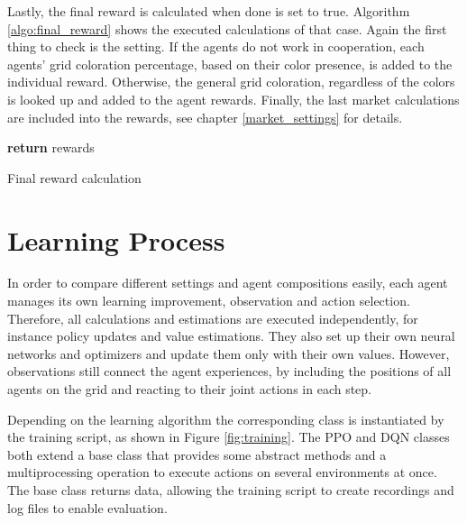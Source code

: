 Lastly, the final reward is calculated when done is set to true. Algorithm \ref{algo:final_reward} shows the executed calculations of that case. Again the first thing to check is the setting. If the agents do not work in cooperation, each agents' grid coloration percentage, based on their color presence, is added to the individual reward. Otherwise, the general grid coloration, regardless of the colors is looked up and added to the agent rewards. Finally, the last market calculations are included into the rewards, see chapter \ref{market_settings} for details.

\begin{algorithm}[H]
    \DontPrintSemicolon
    \textbf{return} rewards\;
    \caption{Final reward calculation}\label{algo:final_reward}
\end{algorithm}

\section{Learning Process}\label{learning_process}
In order to compare different settings and agent compositions easily, each agent manages its own learning improvement, observation and action selection. Therefore, all calculations and estimations are executed independently, for instance policy updates and value estimations. They also set up their own neural networks and optimizers and update them only with their own values. However, observations still connect the agent experiences, by including the positions of all agents on the grid and reacting to their joint actions in each step.

Depending on the learning algorithm the corresponding class is instantiated by the training script, as shown in Figure \ref{fig:training}. The PPO and DQN classes both extend a base class that provides some abstract methods and a multiprocessing operation to execute actions on several environments at once. The base class returns data, allowing the training script to create recordings and log files to enable evaluation.

